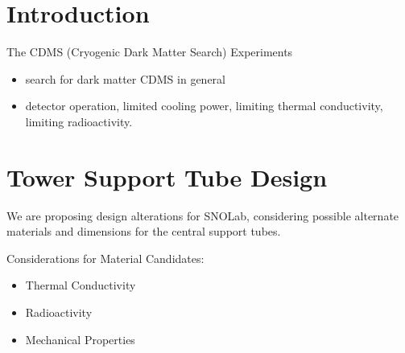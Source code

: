 \documentclass{report}
\begin{document}
\begin{multicols}{2}

\section{Introduction}
The CDMS (Cryogenic Dark Matter Search) Experiments

\begin{itemize}
\item search for dark matter CDMS in general
\item detector operation, limited cooling power, limiting thermal conductivity, limiting
radioactivity.
\end{itemize}
\section{Tower Support Tube Design}
We are proposing design alterations for SNOLab, considering possible alternate materials
and dimensions for the central support tubes.

\bigskip

Considerations for Material Candidates:
\begin{itemize}
\item Thermal Conductivity
\item Radioactivity
\item Mechanical Properties
\end{itemize}


\end{multicols}
\end{document}
